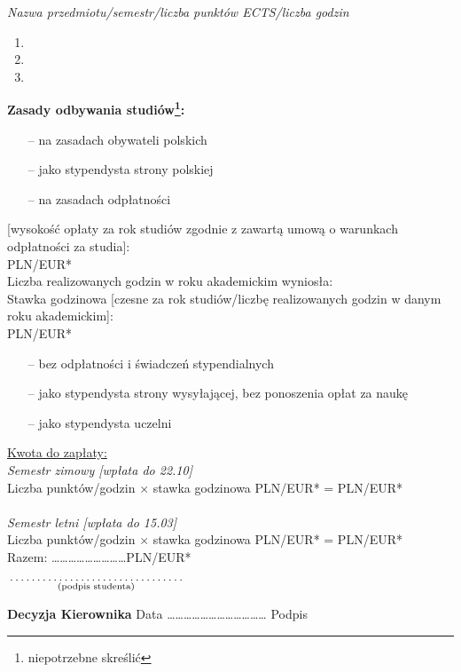 \documentclass[a4paper,11pt]{article}
\newcommand{\fillField}[2]{
    $\underset{\text{#1}}{\parbox[t]{#2}{\dotfill}}$
}
\begin{document}
\noindent
\textit{Nazwa przedmiotu/semestr/liczba punktów ECTS/liczba godzin}
\begin{enumerate}
    \item \dotfill
    \item \dotfill
    \item \dotfill
\end{enumerate}
{\footnotesize
\textbf{Zasady odbywania studiów\footnote[1]{niepotrzebne skreślić}:}
\begin{itemize}
    \itemsep-0.65em
    \item[--] na zasadach obywateli polskich
    \item[--] jako stypendysta strony polskiej
    \item[--] na zasadach odpłatności
\end{itemize}
[wysokość opłaty za rok studiów zgodnie z zawartą umową o warunkach odpłatności za studia]: \dotfill\\ PLN/EUR*\\
Liczba realizowanych godzin w roku akademickim \dotfill wyniosła: \dotfill\\
Stawka godzinowa [czesne za rok studiów/liczbę realizowanych godzin w danym roku akademickim]: \dotfill\\ PLN/EUR*
\begin{itemize}
    \itemsep-0.65em
    \item[--] bez odpłatności i świadczeń stypendialnych
    \item[--] jako stypendysta strony wysyłającej, bez ponoszenia opłat za naukę
    \item[--] jako stypendysta uczelni
\end{itemize}
}

{\footnotesize
\noindent
\underline{Kwota do zapłaty:}\\
\textit{Semestr zimowy [wpłata do 22.10]}\\
Liczba punktów/godzin \dotfill $\times$ stawka godzinowa \dotfill PLN/EUR* = \dotfill PLN/EUR* \\\\
\textit{Semestr letni [wpłata do 15.03]}\\
Liczba punktów/godzin \dotfill $\times$ stawka godzinowa \dotfill PLN/EUR* = \dotfill PLN/EUR* \\

\hspace{\fill} Razem: \ldots\ldots\ldots\ldots\ldots\ldots\ldots\ldots\ldots PLN/EUR* \hspace{2.0cm}
}


\vskip 0.6cm

\hspace{\fill} \fillField{(podpis studenta)}{5cm} \hspace{2.0cm}
\vskip 1.0cm

\noindent
\textbf{Decyzja Kierownika} \dotfill
\vskip 0.5cm
\noindent
Data ……………………………… Podpis \dotfill
\end{document}
